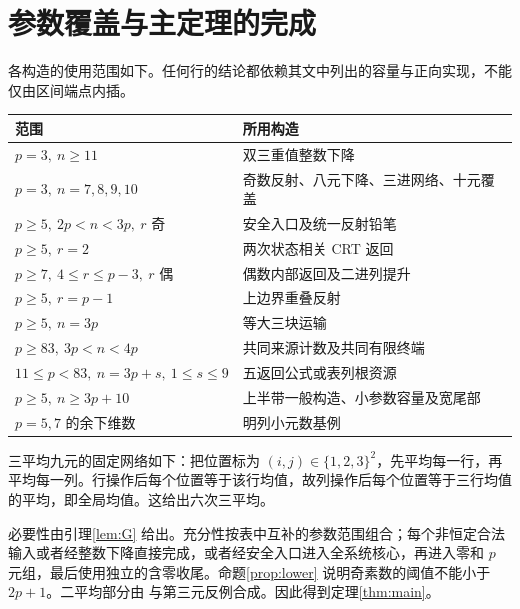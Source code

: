 \section{参数覆盖与主定理的完成}\label{sec:finish}
各构造的使用范围如下。任何行的结论都依赖其文中列出的容量与正向实现，不能仅由区间端点内插。
\begin{center}
\begin{tabular}{ll}
\toprule
范围 & 所用构造\\\midrule
$p=3,\ n\ge11$ & 双三重值整数下降\\
$p=3,\ n=7,8,9,10$ & 奇数反射、八元下降、三进网络、十元覆盖\\
$p\ge5,\ 2p<n<3p,\ r\text{ 奇}$ & 安全入口及统一反射铅笔\\
$p\ge5,\ r=2$ & 两次状态相关 CRT 返回\\
$p\ge7,\ 4\le r\le p-3,\ r\text{ 偶}$ & 偶数内部返回及二进列提升\\
$p\ge5,\ r=p-1$ & 上边界重叠反射\\
$p\ge5,\ n=3p$ & 等大三块运输\\
$p\ge83,\ 3p<n<4p$ & 共同来源计数及共同有限终端\\
$11\le p<83,\ n=3p+s,\ 1\le s\le9$ & 五返回公式或表列根资源\\
$p\ge5,\ n\ge3p+10$ & 上半带一般构造、小参数容量及宽尾部\\
$p=5,7$ 的余下维数 & 明列小元数基例\\
\bottomrule
\end{tabular}
\end{center}
三平均九元的固定网络如下：把位置标为 $(i,j)\in\{1,2,3\}^2$，先平均每一行，再平均每一列。行操作后每个位置等于该行均值，故列操作后每个位置等于三行均值的平均，即全局均值。这给出六次三平均。

必要性由引理\ref{lem:G} 给出。充分性按表中互补的参数范围组合；每个非恒定合法输入或者经整数下降直接完成，或者经安全入口进入全系统核心，再进入零和 $p$ 元组，最后使用独立的含零收尾。命题\ref{prop:lower} 说明奇素数的阈值不能小于 $2p+1$。二平均部分由\cite{mixing} 与第三元反例合成。因此得到定理\ref{thm:main}。


